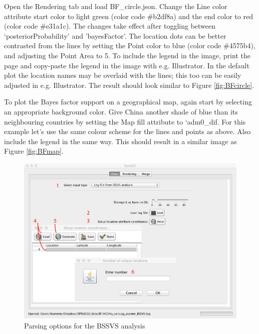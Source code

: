 \documentclass[english]{paper}
\begin{document}
Open the Rendering tab and load BF\_circle.json.
Change the Line color attribute start color to light green (color code \#b2df8a) and the end color to red (color code \#e31a1c).
The changes take effect after toggling between `posteriorProbability' and 'bayesFactor'.
The location dots can be better contrasted from the lines by setting the Point color to blue (color code \#4575b4), and adjusting the Point Area to 5. 
To include the legend in the image, print the page and copy-paste the legend in the image with e.g. Illustrator. 
In the default plot the location names may be overlaid with the lines; this too can be easily adjusted in e.g. Illustrator.
The result should look similar to Figure \ref{fig:BFcircle}.
\par
To plot the Bayes factor support on a geographical map, again start by selecting an appropriate background color.
Give China another shade of blue than its neighbouring countries by setting the Map fill attribute to `adm0\_dif.
For this example let's use the same colour scheme for the lines and points as above. 
Also include the legend in the same way. 
This should result in a similar image as Figure \ref{fig:BFmap}.

\begin{figure}[!H]
\centering
\includegraphics[width=1\textwidth]{./figures/Fig5_BFparse.pdf} %
\caption{Parsing options for the BSSVS analysis}
\label{fig:parseBF}
\end{figure}
\end{document}
